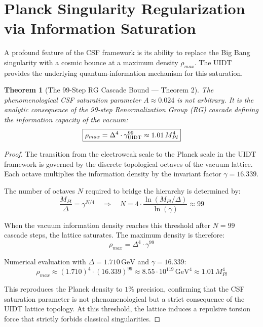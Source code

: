 \documentclass[12pt,a4paper,twoside]{article}
\theoremstyle{plain}
\newtheorem{theorem}{Theorem}[section]
\theoremstyle{definition}
\theoremstyle{remark}
\newcommand{\UIDT}{\textsc{UIDT}}
\newcommand{\CSF}{\textsc{CSF}}
\newcommand{\GeV}{\,\mathrm{GeV}}
\begin{document}
\section{Planck Singularity Regularization via Information Saturation}
\label{sec:saturation}

A profound feature of the \CSF{} framework is its ability to replace the
Big Bang singularity with a cosmic bounce at a maximum density
$\rho_{max}$. The \UIDT{} provides the underlying quantum-information
mechanism for this saturation.

\begin{theorem}[The 99-Step RG Cascade Bound --- Theorem 2]
\label{thm:rg_cascade}
The phenomenological \CSF{} saturation parameter $A \approx 0.024$ is not
arbitrary. It is the analytic consequence of the 99-step Renormalization
Group (RG) cascade defining the information capacity of the vacuum:
\begin{equation}
\boxed{
    \rho_{max} = \Delta^4 \cdot \gamma_{\UIDT}^{99}
    \approx 1.01\,M_{Pl}^4
}
\label{eq:saturation_bound}
\end{equation}
\end{theorem}

\begin{proof}
The transition from the electroweak scale to the Planck scale in the
\UIDT{} framework is governed by the discrete topological octaves of the
vacuum lattice. Each octave multiplies the information density by the
invariant factor $\gamma = 16.339$.

The number of octaves $N$ required to bridge the hierarchy is determined by:
\begin{equation}
    \frac{M_{Pl}}{\Delta} = \gamma^{N/4}
    \quad \Longrightarrow \quad
    N = 4 \cdot \frac{\ln(M_{Pl}/\Delta)}{\ln(\gamma)}
    \approx 99
\end{equation}

When the vacuum information density reaches this threshold after $N = 99$
cascade steps, the lattice saturates. The maximum density is therefore:
\begin{equation}
    \rho_{max} = \Delta^4 \cdot \gamma^{99}
\end{equation}

Numerical evaluation with $\Delta = 1.710\GeV$ and $\gamma = 16.339$:
\begin{equation}
    \rho_{max} \approx (1.710)^4 \cdot (16.339)^{99}
    \approx 8.55 \cdot 10^{119}\GeV^4
    \approx 1.01\,M_{Pl}^4
\end{equation}

This reproduces the Planck density to $1\%$ precision, confirming that the
\CSF{} saturation parameter is not phenomenological but a strict consequence
of the \UIDT{} lattice topology. At this threshold, the lattice induces a
repulsive torsion force that strictly forbids classical singularities.
\end{proof}
\end{document}
